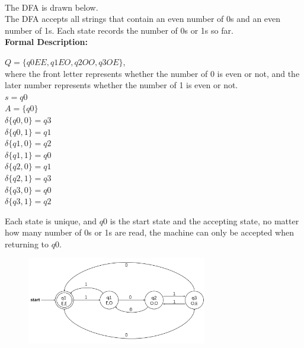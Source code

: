 \documentclass[12pt,a4paper]{article}
\newcommand{\question}[1]{\bigskip\noindent{\textbf{Q{#1} solution}}}
\begin{document}
\question{5.A}
\\The DFA is drawn below.
\\The DFA accepts all strings that contain an even number of 0s and an even number of 1s.
Each state records the number of 0s or 1s so far.
\\  \hspace*{1em} \textbf{Formal Description:}
\\ \begin{center}
$Q=\{q0EE,q1EO,q2OO,q3OE\}$, 
\\where the front letter represents whether the number of 0 is even or not, and the later number
represents whether the number of 1 is even or not.
\\ $s=q0$
\\ $A=\{q0\}$
\\ $\delta\{q0,0\}=q3$
\\ $\delta\{q0,1\}=q1$
\\ $\delta\{q1,0\}=q2$
\\ $\delta\{q1,1\}=q0$
\\ $\delta\{q2,0\}=q1$
\\ $\delta\{q2,1\}=q3$
\\ $\delta\{q3,0\}=q0$
\\ $\delta\{q3,1\}=q2$
\end{center}
Each state is unique, and $q0$ is the start state and the accepting 
state, no matter how many number of 0s or 1s are read, the machine
can only be accepted when returning to $q0$.

\newpage

\begin{figure}
  \centering
  \includegraphics[width = 0.7\textwidth]{img/374hw2.png}
\end{figure}
\end{document}
